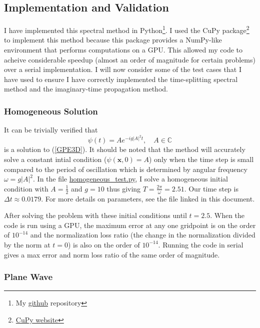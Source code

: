 \documentclass[12]{article}
\begin{document}
\subsection{Implementation and Validation}

I have implemented this spectral method in Python\footnote{My \href{https://github.com/TimSkaras/GPE-SpectralMethod}{github} repository}. I used the CuPy package\footnote{\href{https://cupy.chainer.org}{CuPy website}} to implement this method because this package provides a NumPy-like environment that performs computations on a GPU. This allowed my code to acheive considerable speedup (almost an order of magnitude for certain problems) over a serial implementation. I will now consider some of the test cases that I have used to ensure I have correctly implemented the time-splitting spectral method and the imaginary-time propagation method.

\subsubsection{Homogeneous Solution}

It can be trivially verified that
\begin{equation}
\psi(t) = A e^{-i g|A|^2 t}, \quad A \in \mathbb{C}
\end{equation}
is a solution to (\ref{GPE3D}). It should be noted that the method will accurately solve a constant intial condition ($\psi(\textbf{x},0) = A$) only when the time step is small compared to the period of oscillation which is determined by angular frequency $\omega = g |A|^2$. In the file \href{https://github.com/TimSkaras/GPE-SpectralMethod/blob/master/Tests/homogeneous_test.py}{homogeneous\_test.py}, I solve a homogeneous initial condition with $A = \frac{1}{2}$ and $g = 10$ thus giving $T = \frac{2\pi}{\omega} = 2.51$. Our time step is $\Delta t \approx 0.0179$. For more details on parameters, see the file linked in this document.

After solving the problem with these initial conditions until $t = 2.5$. When the code is run using a GPU, the maximum error at any one gridpoint is on the order of $10^{-14}$ and the normalization loss ratio (the change in the normalization divided by the norm at $t=0$) is also on the order of $10^{-14}$. Running the code in serial gives a max error and norm loss ratio of the same order of magnitude.

\subsubsection{Plane Wave}
\end{document}
